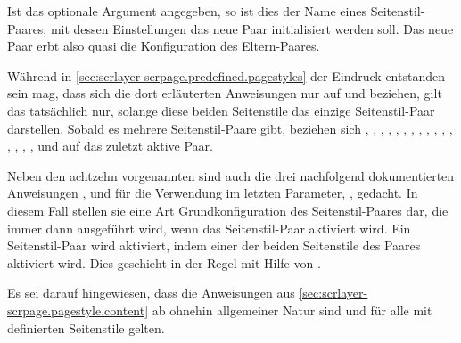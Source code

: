 Ist das optionale Argument  angegeben, so ist dies der Name
eines Seitenstil-Paares, mit dessen Einstellungen das neue Paar initialisiert
werden soll. Das neue Paar erbt also quasi die Konfiguration des
Eltern-Paares.

{\setlength{\emergencystretch}{1em}%
Während in \autoref{sec:scrlayer-scrpage.predefined.pagestyles} der Eindruck
entstanden sein mag, dass sich die dort erläuterten Anweisungen nur auf
 und  beziehen, gilt das
tatsächlich nur, solange diese beiden Seitenstile das einzige Seitenstil-Paar
darstellen. Sobald es mehrere Seitenstil-Paare gibt, beziehen sich 
, ,
, ,
, ,
, ,
, ,
, ,
, ,
, ,
 und 
auf das zuletzt aktive Paar.\par}

{\setlength{\emergencystretch}{1em}%
  Neben den achtzehn vorgenannten sind auch die drei nachfolgend
  dokumentierten Anweisungen
  ,
   und
   für die
  Verwendung im letzten Parameter, , gedacht. In diesem Fall
  stellen sie eine Art Grundkonfiguration des Seitenstil-Paares dar, die immer
  dann ausgeführt wird, wenn das Seitenstil-Paar aktiviert wird. Ein
  Seitenstil-Paar wird aktiviert, indem einer der beiden Seitenstile des
  Paares aktiviert wird. Dies geschieht in der Regel mit Hilfe von
  .\par}

Es sei darauf hingewiesen, dass die Anweisungen aus
\autoref{sec:scrlayer-scrpage.pagestyle.content} ab
 ohnehin allgemeiner Natur
sind und für alle mit  definierten Seitenstile
gelten.

